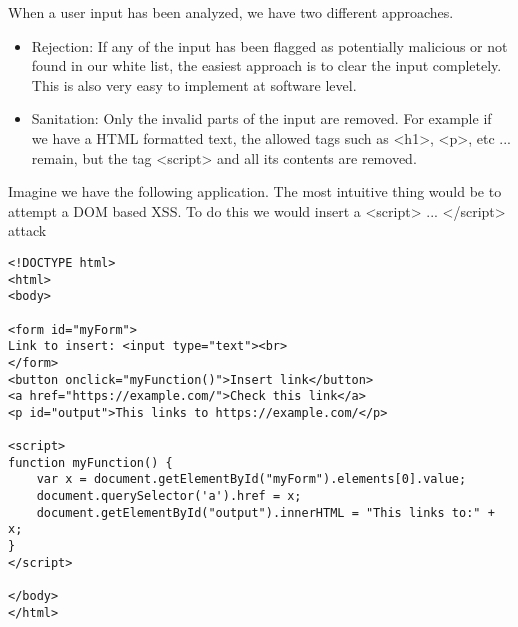 When a user input has been analyzed, we have two different approaches.

\begin{itemize}
\item Rejection: If any of the input has been flagged as potentially malicious or not found in our white list, the easiest approach is to clear the input completely. This is also very easy to implement at software level. 

\item Sanitation: Only the invalid parts of the input are removed. For example if we have a HTML formatted text, the allowed tags such as <h1>, <p>, etc ...  remain, but the tag <script> and all its contents are removed.
\end{itemize}

Imagine we have the following application. The most intuitive thing would be to attempt a DOM based XSS. To do this we would insert a <script> ... </script> attack
\begin{lstlisting}[style=JavaScript]
<!DOCTYPE html>
<html>
<body>

<form id="myForm">
Link to insert: <input type="text"><br>
</form> 
<button onclick="myFunction()">Insert link</button>
<a href="https://example.com/">Check this link</a>
<p id="output">This links to https://example.com/</p>

<script>
function myFunction() {
	var x = document.getElementById("myForm").elements[0].value;
	document.querySelector('a').href = x;
	document.getElementById("output").innerHTML = "This links to:" + x;
}
</script>

</body>
</html>

\end{lstlisting}